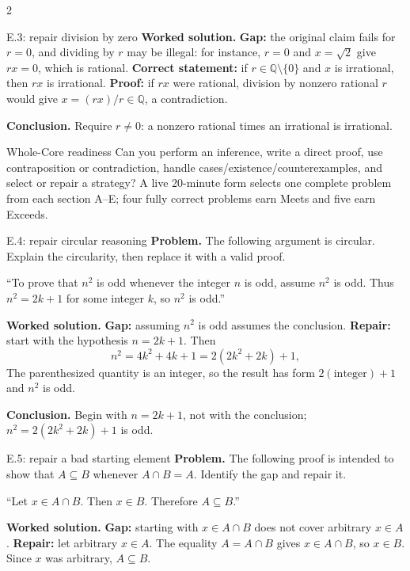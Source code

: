 \documentclass[10pt]{article}
\begin{document}
\begin{multicols}{2}
\begin{workedbox}{E.3: repair division by zero}
\textbf{Worked solution.} \textbf{Gap:} the original claim fails for $r=0$, and dividing by $r$ may be
illegal: for instance, $r=0$ and $x=\sqrt2$ give $rx=0$, which is rational. \textbf{Correct statement:} if $r\in\mathbb Q\setminus\{0\}$ and $x$
is irrational, then $rx$ is irrational. \textbf{Proof:} if $rx$ were rational,
division by nonzero rational $r$ would give $x=(rx)/r\in\mathbb Q$, a
contradiction.

\textbf{Conclusion.} Require $r\ne0$: a nonzero rational times an irrational is irrational.
\end{workedbox}

\begin{checklistbox}{Whole-Core readiness}
Can you perform an inference, write a direct proof, use contraposition or
contradiction, handle cases/existence/counterexamples, and select or repair a
strategy? A live 20-minute form selects one complete problem from each section
A--E; four fully correct problems earn Meets and five earn Exceeds.
\end{checklistbox}

\columnbreak
\begin{workedbox}{E.4: repair circular reasoning}
\textbf{Problem.} The following argument is circular. Explain the circularity, then replace it with a valid proof.

``To prove that $n^2$ is odd whenever the integer $n$ is odd, assume $n^2$ is odd. Thus $n^2=2k+1$ for some integer $k$, so $n^2$ is odd.''

\textbf{Worked solution.} \textbf{Gap:} assuming $n^2$ is odd assumes the conclusion. \textbf{Repair:}
start with the hypothesis $n=2k+1$. Then
\[
n^2=4k^2+4k+1=2(2k^2+2k)+1,
\]
The parenthesized quantity is an integer, so the result has form
$2(\text{integer})+1$ and $n^2$ is odd.

\textbf{Conclusion.} Begin with $n=2k+1$, not with the conclusion; $n^2=2(2k^2+2k)+1$ is odd.
\end{workedbox}


\begin{workedbox}{E.5: repair a bad starting element}
\textbf{Problem.} The following proof is intended to show that $A\subseteq B$ whenever $A\cap B=A$. Identify the gap and repair it.

``Let $x\in A\cap B$. Then $x\in B$. Therefore $A\subseteq B$.''

\textbf{Worked solution.} \textbf{Gap:} starting with $x\in A\cap B$ does not cover arbitrary $x\in A$.
\textbf{Repair:} let arbitrary $x\in A$. The equality $A=A\cap B$ gives
$x\in A\cap B$, so $x\in B$. Since $x$ was arbitrary, $A\subseteq B$.


\end{workedbox}
\end{multicols}
\end{document}
